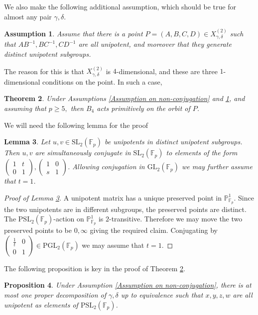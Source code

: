 \documentclass[letterpaper]{amsart}
\newtheorem{theorem}{Theorem}[section]
\newtheorem{lemma}[theorem]{Lemma}
\newtheorem{proposition}[theorem]{Proposition}
\newtheorem{assumption}[theorem]{Assumption}
\begin{document}
We also make the following additional assumption, which should be true for almost any pair $\gamma,\delta$.
\begin{assumption}
\label{Assumption on point in orbit}
    Assume that there is a point $P = (A,B,C,D) \in X_{\gamma,\delta}^{(2)}$ such that $AB^{-1},BC^{-1},CD^{-1}$ are all unipotent, and moreover that they generate distinct unipotent subgroups.
\end{assumption}
The reason for this is that $X_{\gamma,\delta}^{(2)}$ is $4$-dimensional, and these are three $1$-dimensional conditions on the point. In such a case,
\begin{theorem} \label{Primitive action on orbit}
Under Assumptions \ref{Assumption on non-conjugation} and \ref{Assumption on point in orbit}, and assuming that $p \geq 5,$ then $B_4$ acts primitively on the orbit of $P$.
\end{theorem}
We will need the following lemma for the proof
\begin{lemma}
\label{Lemma on opposite unipotents}
    Let $u, v \in \mathrm{SL}_2(\mathbb{F}_p)$ be unipotents in distinct unipotent subgroups. Then $u, v$ are simultaneously conjugate in $\mathrm{SL}_2(\mathbb{F}_p)$ to elements of the form $\begin{pmatrix}1 & t \\ 0 & 1\end{pmatrix},\begin{pmatrix}1 & 0 \\ s & 1\end{pmatrix}$. Allowing conjugation in $\mathrm{GL}_2(\mathbb{F}_p)$ we may further assume that $t = 1$.
\end{lemma}
\begin{proof}[Proof of Lemma \ref{Lemma on opposite unipotents}]
    A unipotent matrix has a unique preserved point in $\mathbb{P}^1_{\mathbb{F}_p}$. Since the two unipotents are in different subgroups, the preserved points are distinct. The $\mathrm{PSL}_2(\mathbb{F}_p)$-action on $\mathbb{P}^1_{\mathbb{F}_p}$ is $2$-transitive. Therefore we may move the two preserved points to be $0, \infty$ giving the required claim.
    Conjugating by $\begin{pmatrix}\frac{1}{t} & 0 \\ 0 & 1\end{pmatrix} \in \mathrm{PGL}_2(\mathbb{F}_p)$ we may assume that $t = 1$.
\end{proof}
The following proposition is key in the proof of Theorem \ref{Primitive action on orbit}.
\begin{proposition}
\label{Unique unipotent proper decomposition}
    Under Assumption \ref{Assumption on non-conjugation}, there is at most one proper decomposition of $\gamma,\delta$ up to equivalence such that $x,y,z,w$ are all unipotent as elements of $\mathrm{PSL}_2(\mathbb{F}_p)$.
\end{proposition}
\end{document}
